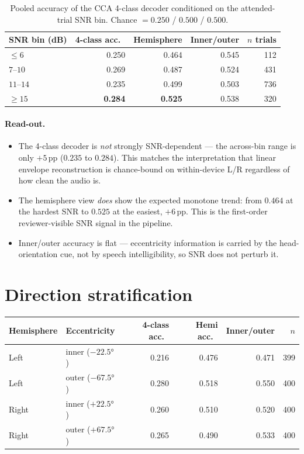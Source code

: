 \begin{table}[ht]
\centering
\begin{tabular}{lrrrr}
\toprule
SNR bin (dB) & 4-class acc.\ & Hemisphere & Inner/outer & $n$ trials \\
\midrule
$\leq 6$    & 0.250 & 0.464 & 0.545 & 112 \\
$7$--$10$   & 0.269 & 0.487 & 0.524 & 431 \\
$11$--$14$  & 0.235 & 0.499 & 0.503 & 736 \\
$\geq 15$   & \textbf{0.284} & \textbf{0.525} & 0.538 & 320 \\
\bottomrule
\end{tabular}
\caption{Pooled accuracy of the CCA 4-class decoder conditioned on the
attended-trial SNR bin. Chance $= 0.250$ / $0.500$ / $0.500$.}
\end{table}

\paragraph{Read-out.}
\begin{itemize}
  \item The 4-class decoder is \emph{not} strongly SNR-dependent --- the
        across-bin range is only $+5$\,pp ($0.235$ to $0.284$). This
        matches the interpretation that linear envelope reconstruction
        is chance-bound on within-device L/R regardless of how clean
        the audio is.
  \item The hemisphere view \emph{does} show the expected monotone
        trend: from $0.464$ at the hardest SNR to $0.525$ at the easiest,
        $+6$\,pp. This is the first-order reviewer-visible SNR signal
        in the pipeline.
  \item Inner/outer accuracy is flat --- eccentricity information is
        carried by the head-orientation cue, not by speech intelligibility,
        so SNR does not perturb it.
\end{itemize}

\section{Direction stratification}

\begin{table}[ht]
\centering
\begin{tabular}{llrrrr}
\toprule
Hemisphere & Eccentricity & 4-class acc.\ & Hemi acc.\ & Inner/outer & $n$ \\
\midrule
Left  & inner ($-22.5°$) & 0.216 & 0.476 & 0.471 & 399 \\
Left  & outer ($-67.5°$) & 0.280 & 0.518 & 0.550 & 400 \\
Right & inner ($+22.5°$) & 0.260 & 0.510 & 0.520 & 400 \\
Right & outer ($+67.5°$) & 0.265 & 0.490 & 0.533 & 400 \\
\bottomrule
\end{tabular}
\end{table}


